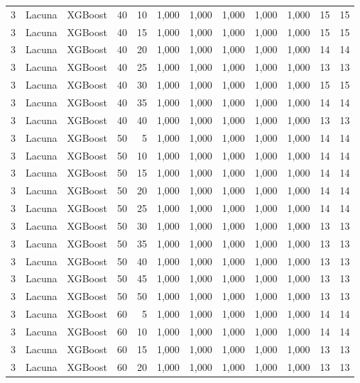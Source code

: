 \begin{longtable}{@{}rllrrrrrrrrr@{}}
3 & Lacuna & XGBoost & 40 & 10 & 1,000 & 1,000 & 1,000 & 1,000 & 1,000 & 15 & 15 \\
3 & Lacuna & XGBoost & 40 & 15 & 1,000 & 1,000 & 1,000 & 1,000 & 1,000 & 15 & 15 \\
3 & Lacuna & XGBoost & 40 & 20 & 1,000 & 1,000 & 1,000 & 1,000 & 1,000 & 14 & 14 \\
3 & Lacuna & XGBoost & 40 & 25 & 1,000 & 1,000 & 1,000 & 1,000 & 1,000 & 13 & 13 \\
3 & Lacuna & XGBoost & 40 & 30 & 1,000 & 1,000 & 1,000 & 1,000 & 1,000 & 15 & 15 \\
3 & Lacuna & XGBoost & 40 & 35 & 1,000 & 1,000 & 1,000 & 1,000 & 1,000 & 14 & 14 \\
3 & Lacuna & XGBoost & 40 & 40 & 1,000 & 1,000 & 1,000 & 1,000 & 1,000 & 13 & 13 \\
3 & Lacuna & XGBoost & 50 & 5 & 1,000 & 1,000 & 1,000 & 1,000 & 1,000 & 14 & 14 \\
3 & Lacuna & XGBoost & 50 & 10 & 1,000 & 1,000 & 1,000 & 1,000 & 1,000 & 14 & 14 \\
3 & Lacuna & XGBoost & 50 & 15 & 1,000 & 1,000 & 1,000 & 1,000 & 1,000 & 14 & 14 \\
3 & Lacuna & XGBoost & 50 & 20 & 1,000 & 1,000 & 1,000 & 1,000 & 1,000 & 14 & 14 \\
3 & Lacuna & XGBoost & 50 & 25 & 1,000 & 1,000 & 1,000 & 1,000 & 1,000 & 14 & 14 \\
3 & Lacuna & XGBoost & 50 & 30 & 1,000 & 1,000 & 1,000 & 1,000 & 1,000 & 13 & 13 \\
3 & Lacuna & XGBoost & 50 & 35 & 1,000 & 1,000 & 1,000 & 1,000 & 1,000 & 13 & 13 \\
3 & Lacuna & XGBoost & 50 & 40 & 1,000 & 1,000 & 1,000 & 1,000 & 1,000 & 13 & 13 \\
3 & Lacuna & XGBoost & 50 & 45 & 1,000 & 1,000 & 1,000 & 1,000 & 1,000 & 13 & 13 \\
3 & Lacuna & XGBoost & 50 & 50 & 1,000 & 1,000 & 1,000 & 1,000 & 1,000 & 13 & 13 \\
3 & Lacuna & XGBoost & 60 & 5 & 1,000 & 1,000 & 1,000 & 1,000 & 1,000 & 14 & 14 \\
3 & Lacuna & XGBoost & 60 & 10 & 1,000 & 1,000 & 1,000 & 1,000 & 1,000 & 14 & 14 \\
3 & Lacuna & XGBoost & 60 & 15 & 1,000 & 1,000 & 1,000 & 1,000 & 1,000 & 13 & 13 \\
3 & Lacuna & XGBoost & 60 & 20 & 1,000 & 1,000 & 1,000 & 1,000 & 1,000 & 13 & 13 \\

\end{longtable}
